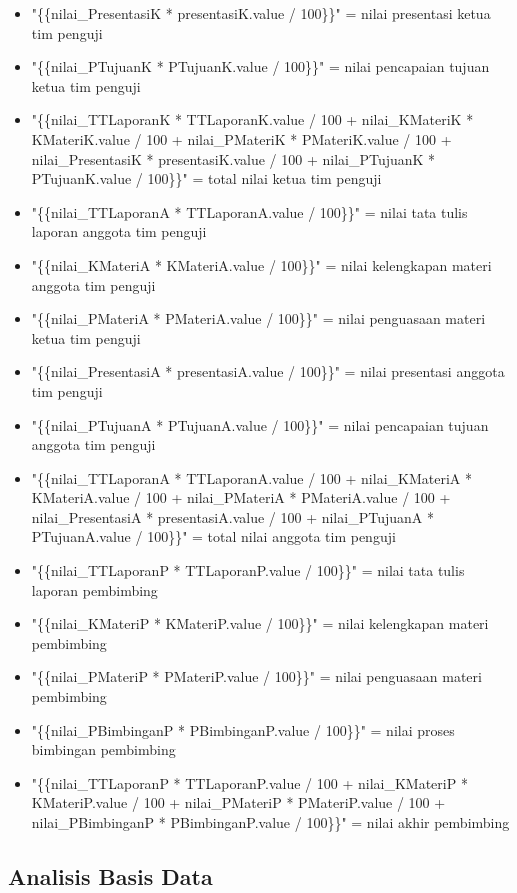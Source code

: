 \begin{itemize}
\begin{itemize}
			\item "\{\{nilai\_PresentasiK * presentasiK.value / 100\}\}" = nilai presentasi ketua tim penguji
			\item "\{\{nilai\_PTujuanK * PTujuanK.value / 100\}\}" = nilai pencapaian tujuan ketua tim penguji
			\item "\{\{nilai\_TTLaporanK * TTLaporanK.value / 100 + nilai\_KMateriK * KMateriK.value / 100 + nilai\_PMateriK * PMateriK.value / 100 + nilai\_PresentasiK * presentasiK.value / 100 + nilai\_PTujuanK * PTujuanK.value / 100\}\}" = total nilai ketua tim penguji
			\item "\{\{nilai\_TTLaporanA * TTLaporanA.value / 100\}\}" = nilai tata tulis laporan anggota tim penguji
			\item "\{\{nilai\_KMateriA * KMateriA.value / 100\}\}" = nilai kelengkapan materi anggota tim penguji
			\item "\{\{nilai\_PMateriA * PMateriA.value / 100\}\}" = nilai penguasaan materi ketua tim penguji
			\item "\{\{nilai\_PresentasiA * presentasiA.value / 100\}\}" = nilai presentasi anggota tim penguji
			\item "\{\{nilai\_PTujuanA * PTujuanA.value / 100\}\}" = nilai pencapaian tujuan anggota tim penguji
			\item "\{\{nilai\_TTLaporanA * TTLaporanA.value / 100 + nilai\_KMateriA * KMateriA.value / 100 + nilai\_PMateriA * PMateriA.value / 100 + nilai\_PresentasiA * presentasiA.value / 100 + nilai\_PTujuanA * PTujuanA.value / 100\}\}" = total nilai anggota tim penguji
			\item "\{\{nilai\_TTLaporanP * TTLaporanP.value / 100\}\}" = nilai tata tulis laporan pembimbing
			\item "\{\{nilai\_KMateriP * KMateriP.value / 100\}\}" = nilai kelengkapan materi pembimbing
			\item "\{\{nilai\_PMateriP * PMateriP.value / 100\}\}" = nilai penguasaan materi pembimbing
			\item "\{\{nilai\_PBimbinganP * PBimbinganP.value / 100\}\}" = nilai proses bimbingan pembimbing
			\item "\{\{nilai\_TTLaporanP * TTLaporanP.value / 100 + nilai\_KMateriP * KMateriP.value / 100 + nilai\_PMateriP * PMateriP.value / 100 + nilai\_PBimbinganP * PBimbinganP.value / 100\}\}" = nilai akhir pembimbing
		\end{itemize}
	\end{itemize}
	
	\subsection{Analisis Basis Data}
	\label{sub: analisisDatabase}
	
